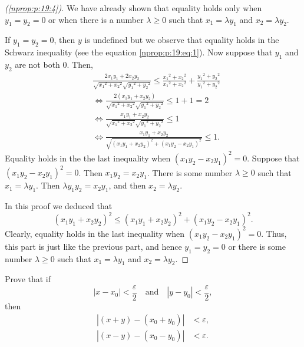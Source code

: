 \begin{proof}[(\ref{nprop:p:19:4})]
	\hfill

	We have already shown that equality holds only when $y_1 = y_2 = 0$ or when there is a number $\lambda \geq 0$ such that $x_1 = \lambda y_1$ and $x_2 = \lambda y_2$.

	If $y_1 = y_2 = 0$, then $y$ is undefined but we observe that equality holds in the Schwarz inequality (see the equation \eqref{nprop:p:19:eq:1}). Now suppose that $y_1$ and $y_2$ are not both 0. Then,
	\begin{align*}
		 & \frac{2 x_1 y_1 + 2 x_2 y_2}{\sqrt{x_1{ }^2 + x_2{ }^2} \sqrt{y_1{ }^2 + y_2{ }^2}} \leq \frac{x_1{ }^2 + x_2{ }^2}{x_1{ }^2 + x_2{ }^2} + \frac{y_1{ }^2 + y_2{ }^2}{y_1{ }^2 + y_2{ }^2} \\
		 & \iff \frac{2 (x_1 y_1 + x_2 y_2)}{\sqrt{x_1{ }^2 + x_2{ }^2} \sqrt{y_1{ }^2 + y_2{ }^2}} \leq 1 + 1 = 2                                                                                    \\
		 & \iff \frac{x_1 y_1 + x_2 y_2}{\sqrt{x_1{ }^2 + x_2{ }^2} \sqrt{y_1{ }^2 + y_2{ }^2}} \leq 1                                                                                                \\
		 & \iff \frac{x_1 y_1 + x_2 y_2}{\sqrt{(x_1 y_1 + x_2 y_2)^2 + (x_1 y_2 - x_2 y_1)^2}} \leq 1.
	\end{align*}
	Equality holds in the the last inequality when $(x_1 y_2 - x_2 y_1)^2 = 0$. Suppose that $(x_1 y_2 - x_2 y_1)^2 = 0$. Then $x_1 y_2 = x_2 y_1$. There is some number $\lambda \geq 0$ such that $x_1 = \lambda y_1$. Then $\lambda y_1 y_2 = x_2 y_1$, and then $x_2 = \lambda y_2$.

	In this proof we deduced that
	$$
		(x_1 y_1 + x_2 y_2)^2 \leq (x_1 y_1 + x_2 y_2)^2 + (x_1 y_2 - x_2 y_1)^2.
	$$
	Clearly, equality holds in the last inequality when $(x_1 y_2 - x_2 y_1)^2 = 0$. Thus, this part is just like the previous part, and hence $y_1 = y_2 = 0$ or there is some number $\lambda \geq 0$ such that $x_1 = \lambda y_1$ and $x_2 = \lambda y_2$.
\end{proof}


\Newpage
\begin{problem} %
	Prove that if
	$$
		| x - x_0 | < \frac{\varepsilon}{2} \quad \text {and} \quad | y - y_0 | < \frac{\varepsilon}{2},
	$$
	then
	\begin{align*}
		|(x + y) - (x_0 + y_0)| & < \varepsilon, \\
		|(x - y) - (x_0 - y_0)| & < \varepsilon.
	\end{align*}
\end{problem}

